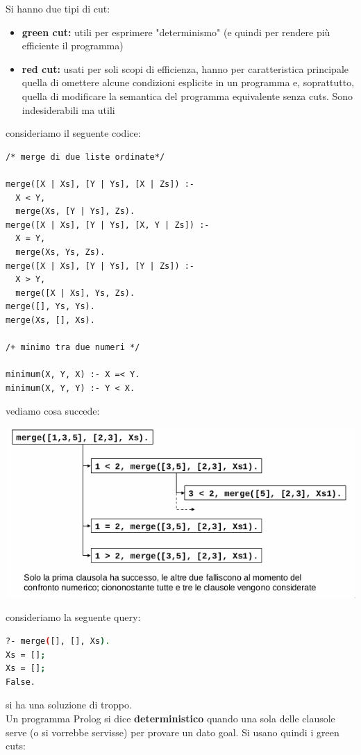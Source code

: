 \documentclass[a4paper,12pt, oneside]{book}
\begin{document}
Si hanno due tipi di cut:
\begin{itemize}
	\item \textbf{green cut: } utili per esprimere "determinismo" (e quindi per rendere più efficiente il programma)
	\item \textbf{red cut: } usati per soli scopi di efficienza, hanno per caratteristica principale quella di omettere alcune condizioni esplicite in un programma e, soprattutto, quella di modificare la semantica del programma equivalente senza cuts. Sono indesiderabili ma utili
\end{itemize}
consideriamo il seguente codice:
\begin{verbatim}
/* merge di due liste ordinate*/

merge([X | Xs], [Y | Ys], [X | Zs]) :-
  X < Y,
  merge(Xs, [Y | Ys], Zs).
merge([X | Xs], [Y | Ys], [X, Y | Zs]) :-
  X = Y,
  merge(Xs, Ys, Zs).
merge([X | Xs], [Y | Ys], [Y | Zs]) :-
  X > Y,
  merge([X | Xs], Ys, Zs).
merge([], Ys, Ys).
merge(Xs, [], Xs).

/+ minimo tra due numeri */

minimum(X, Y, X) :- X =< Y.
minimum(X, Y, Y) :- Y < X.
\end{verbatim}
vediamo cosa succede:
\begin{center}
	\includegraphics[scale=0.8]{img/cut2.png}
\end{center}
consideriamo la seguente query:
\begin{shaded}
	\begin{lstlisting}[language=bash]
?- merge([], [], Xs).
Xs = [];
Xs = [];
False.
\end{lstlisting}
\end{shaded}
si ha una soluzione di troppo.\\
Un programma Prolog si dice \textbf{deterministico} quando una sola delle clausole serve (o si vorrebbe servisse) per provare un dato goal. Si usano quindi i green cuts:
\end{document}
